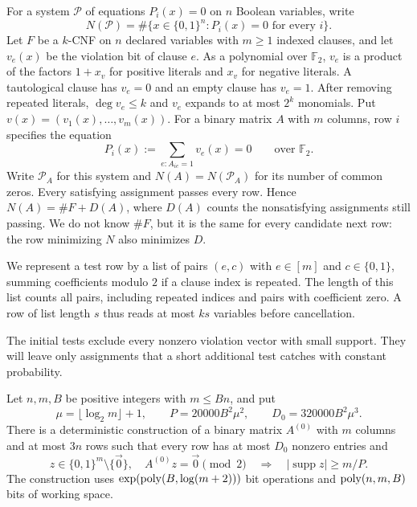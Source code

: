 For a system $\mathcal P$ of equations $P_i(x)=0$ on $n$ Boolean
variables, write
\begin{equation}\label{eq:common-zero-count}
 N(\mathcal P)=\#\{x\in\{0,1\}^n:P_i(x)=0\text{ for every }i\}.
\end{equation}
Let $F$ be a $k$-CNF on $n$ declared variables with $m\ge1$
indexed clauses, and let $v_e(x)$ be the violation bit
of clause $e$. As a polynomial over $\mathbb F_2$, $v_e$ is a product
of the factors $1+x_v$ for positive literals and $x_v$ for negative
literals. A tautological clause has $v_e=0$ and an empty clause has
$v_e=1$. After removing repeated literals, $\deg v_e\le k$ and $v_e$
expands to at most $2^k$ monomials. Put $v(x)=(v_1(x),\ldots,v_m(x))$.
For a binary matrix $A$ with $m$ columns, row $i$ specifies the equation
\begin{equation}\label{eq:hash-query}
 P_i(x):=\sum_{e:A_{ie}=1} v_e(x)=0\qquad\text{over }\mathbb F_2.
\end{equation}
Write $\mathcal P_A$ for this system and $N(A)=N(\mathcal P_A)$ for its
number of common zeros. Every satisfying assignment passes every row.
Hence $N(A)=\#F+D(A)$, where $D(A)$ counts the nonsatisfying assignments
still passing. We do not know $\#F$, but it is the same for every
candidate next row: the row minimizing $N$ also minimizes $D$.

We represent a test row by a list of pairs $(e,c)$ with
$e\in[m]$ and $c\in\{0,1\}$, summing coefficients modulo $2$ if a
clause index is repeated. The length of this list counts all pairs,
including repeated indices and pairs with coefficient zero. A row of
list length $s$ thus reads at most $ks$ variables before cancellation.


The initial tests exclude every nonzero violation vector with small
support. They will leave only assignments that a short additional
test catches with constant probability.

\begin{lemma}\label{lem:sparse-checks}
Let $n,m,B$ be positive integers with $m\le Bn$, and put
\[
 \mu=\lfloor\log_2 m\rfloor+1,\qquad
 P=20000B^2\mu^2,\qquad D_0=320000B^2\mu^3.
\]
There is a deterministic construction of a binary matrix
$A^{(0)}$ with $m$ columns and at most $3n$ rows such that every row
has at most $D_0$ nonzero entries and
\[
 z\in\{0,1\}^m\setminus\{\vec{0}\},\quad
 A^{(0)}z=\vec{0}\pmod2
 \quad\Longrightarrow\quad
 |\operatorname{supp}z|\ge m/P.
\]
The construction uses $\exp(\operatorname{poly}(B,\log(m+2)))$
bit operations and $\operatorname{poly}(n,m,B)$ bits of working space.
\end{lemma}

